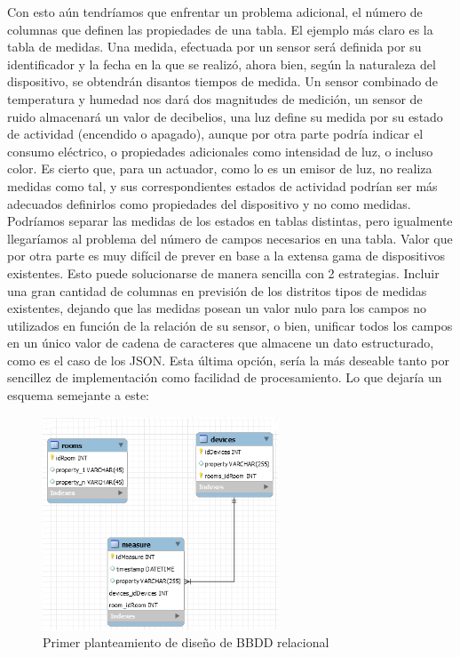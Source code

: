 \vspace{1.5cm}

Con esto aún tendríamos que enfrentar un problema adicional, el número de columnas que definen las propiedades de una tabla. El ejemplo más claro es la tabla de medidas. Una medida, efectuada por un sensor será definida por su identificador y la fecha en la que se realizó, ahora bien, según la naturaleza del dispositivo, se obtendrán disantos tiempos de medida. Un sensor combinado de temperatura y humedad nos dará dos magnitudes de medición, un sensor de ruido almacenará un valor de decibelios, una luz define su medida por su estado de actividad (encendido o apagado), aunque por otra parte podría indicar el consumo eléctrico, o propiedades adicionales como intensidad de luz, o incluso color. Es cierto que, para un actuador, como lo es un emisor de luz, no realiza medidas como tal, y sus correspondientes estados de actividad podrían ser más adecuados definirlos como propiedades del dispositivo y no como medidas. Podríamos separar las medidas de los estados en tablas distintas, pero igualmente llegaríamos al problema del número de campos necesarios en una tabla. Valor que por otra parte es muy difícil de prever en base a la extensa gama de dispositivos existentes. Esto puede solucionarse de manera sencilla con 2 estrategias. Incluir una gran cantidad de columnas en previsión de los distritos tipos de medidas existentes, dejando que las medidas posean un valor nulo para los campos no utilizados en función de la relación de su sensor, o bien, unificar todos los campos en un único valor de cadena de caracteres que almacene un dato estructurado, como es el caso de los JSON. Esta última opción, sería la más deseable tanto por sencillez de implementación como facilidad de procesamiento. Lo que dejaría un esquema semejante a este:

\begin{figure}[hbt!]
\centering
\includegraphics[height=2.5in]{figures/SQLSchemaExample_3.png}
\caption[Tercer planteamiento de diseño de BBDD relacional]{Primer planteamiento de diseño de BBDD relacional\footnotemark}
\end{figure}

